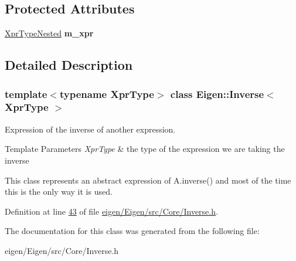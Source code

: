 \subsection*{Protected Attributes}
\begin{DoxyCompactItemize}
\item 
\mbox{\label{class_eigen_1_1_inverse_a702bb2d052c32edff4d7cf646b3bf039}} 
\hyperlink{class_eigen_1_1internal_1_1_tensor_lazy_evaluator_writable}{Xpr\+Type\+Nested} {\bfseries m\+\_\+xpr}
\end{DoxyCompactItemize}


\subsection{Detailed Description}
\subsubsection*{template$<$typename Xpr\+Type$>$\newline
class Eigen\+::\+Inverse$<$ Xpr\+Type $>$}

Expression of the inverse of another expression. 


\begin{DoxyTemplParams}{Template Parameters}
{\em Xpr\+Type} & the type of the expression we are taking the inverse\\
\hline
\end{DoxyTemplParams}
This class represents an abstract expression of A.\+inverse() and most of the time this is the only way it is used. 

Definition at line \hyperlink{eigen_2_eigen_2src_2_core_2_inverse_8h_source_l00043}{43} of file \hyperlink{eigen_2_eigen_2src_2_core_2_inverse_8h_source}{eigen/\+Eigen/src/\+Core/\+Inverse.\+h}.



The documentation for this class was generated from the following file\+:\begin{DoxyCompactItemize}
\item 
eigen/\+Eigen/src/\+Core/\+Inverse.\+h\end{DoxyCompactItemize}
